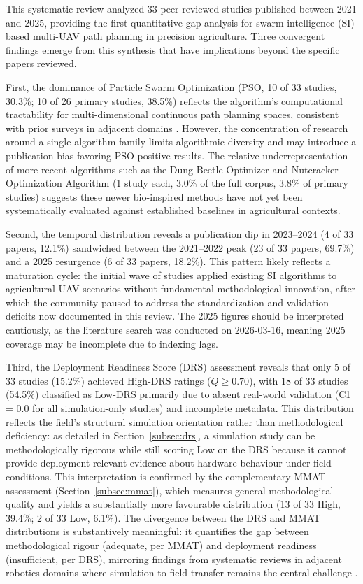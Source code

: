 \documentclass[review,3p,times]{elsarticle}
\begin{document}
This systematic review analyzed 33 peer-reviewed studies published between 2021 and 2025, providing the first quantitative gap analysis for swarm intelligence (SI)-based multi-UAV path planning in precision agriculture. Three convergent findings emerge from this synthesis that have implications beyond the specific papers reviewed.

First, the dominance of Particle Swarm Optimization (PSO, 10 of 33 studies, 30.3\%; 10 of 26 primary studies, 38.5\%) reflects the algorithm's computational tractability for multi-dimensional continuous path planning spaces, consistent with prior surveys in adjacent domains \cite{puente2022,sharma2022}. However, the concentration of research around a single algorithm family limits algorithmic diversity and may introduce a publication bias favoring PSO-positive results. The relative underrepresentation of more recent algorithms such as the Dung Beetle Optimizer \cite{li2023} and Nutcracker Optimization Algorithm \cite{xiao2025} (1 study each, 3.0\% of the full corpus, 3.8\% of primary studies) suggests these newer bio-inspired methods have not yet been systematically evaluated against established baselines in agricultural contexts.

Second, the temporal distribution reveals a publication dip in 2023--2024 (4 of 33 papers, 12.1\%) sandwiched between the 2021--2022 peak (23 of 33 papers, 69.7\%) and a 2025 resurgence (6 of 33 papers, 18.2\%). This pattern likely reflects a maturation cycle: the initial wave of studies applied existing SI algorithms to agricultural UAV scenarios without fundamental methodological innovation, after which the community paused to address the standardization and validation deficits now documented in this review. The 2025 figures should be interpreted cautiously, as the literature search was conducted on 2026-03-16, meaning 2025 coverage may be incomplete due to indexing lags.

Third, the Deployment Readiness Score (DRS) assessment reveals that only 5 of 33 studies (15.2\%) achieved High-DRS ratings ($Q \geq 0.70$), with 18 of 33 studies (54.5\%) classified as Low-DRS primarily due to absent real-world validation (C1 = 0.0 for all simulation-only studies) and incomplete metadata. This distribution reflects the field's structural simulation orientation rather than methodological deficiency: as detailed in Section~\ref{subsec:drs}, a simulation study can be methodologically rigorous while still scoring Low on the DRS because it cannot provide deployment-relevant evidence about hardware behaviour under field conditions. This interpretation is confirmed by the complementary MMAT assessment (Section~\ref{subsec:mmat}), which measures general methodological quality and yields a substantially more favourable distribution (13 of 33 High, 39.4\%; 2 of 33 Low, 6.1\%). The divergence between the DRS and MMAT distributions is substantively meaningful: it quantifies the gap between methodological rigour (adequate, per MMAT) and deployment readiness (insufficient, per DRS), mirroring findings from systematic reviews in adjacent robotics domains where simulation-to-field transfer remains the central challenge \cite{brambilla2013}.
\end{document}
